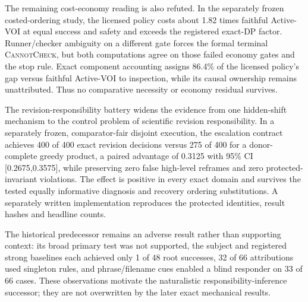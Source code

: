 The remaining cost-economy reading is also refuted. In the separately frozen
costed-ordering study, the licensed policy costs about 1.82 times faithful
Active-VOI at equal success and safety and exceeds the registered exact-DP
factor. Runner/checker ambiguity on a different gate forces the formal terminal
\textsc{CannotCheck}, but both computations agree on those failed economy gates
and the stop rule. Exact component accounting assigns 86.4\% of the licensed
policy's gap versus faithful Active-VOI to inspection, while its causal ownership
remains unattributed. Thus no comparative necessity or economy residual survives.

The revision-responsibility battery widens the evidence from one hidden-shift
mechanism to the control problem of scientific revision responsibility. In a
separately frozen, comparator-fair disjoint execution, the escalation contract
achieves 400 of 400 exact revision decisions versus 275 of 400 for a
donor-complete greedy product, a paired advantage of 0.3125 with 95\% CI
[0.2675,0.3575], while preserving zero false high-level reframes and zero
protected-invariant violations. The effect is positive in every exact domain and
survives the tested equally informative diagnosis and recovery ordering
substitutions. A separately written implementation reproduces the protected
identities, result hashes and headline counts.

The historical predecessor remains an adverse result rather than supporting
context: its broad primary test was not supported, the subject and registered
strong baselines each achieved only 1 of 48 root successes, 32 of 66
attributions used singleton rules, and phrase/filename cues enabled a blind
responder on 33 of 66 cases. These observations motivate the naturalistic
responsibility-inference successor; they are not overwritten by the later exact
mechanical results.

